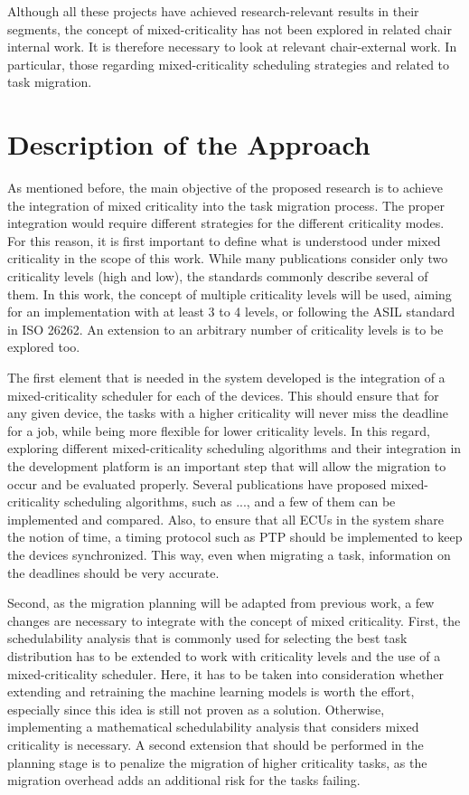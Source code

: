Although all these projects have achieved research-relevant results in their segments, the concept of mixed-criticality has not been explored in related chair internal work. It is therefore necessary to look at relevant chair-external work. In particular, those regarding mixed-criticality scheduling strategies and related to task migration.



\section*{Description of the Approach}\label{section:descriptionapproach}

As mentioned before, the main objective of the proposed research is to achieve the integration of mixed criticality into the task migration process. The proper integration would require different strategies for the different criticality modes. For this reason, it is first important to define what is understood under mixed criticality in the scope of this work. While many publications consider only two criticality levels (high and low), the standards commonly describe several of them. In this work, the concept of multiple criticality levels will be used, aiming for an implementation with at least 3 to 4 levels, or following the ASIL standard in ISO 26262. An extension to an arbitrary number of criticality levels is to be explored too.

The first element that is needed in the system developed is the integration of a mixed-criticality scheduler for each of the devices. This should ensure that for any given device, the tasks with a higher criticality will never miss the deadline for a job, while being more flexible for lower criticality levels. In this regard, exploring different mixed-criticality scheduling algorithms and their integration in the development platform is an important step that will allow the migration to occur and be evaluated properly. Several publications have proposed mixed-criticality scheduling algorithms, such as ..., and a few of them can be implemented and compared. Also, to ensure that all ECUs in the system share the notion of time, a timing protocol such as PTP should be implemented to keep the devices synchronized. This way, even when migrating a task, information on the deadlines should be very accurate.

Second, as the migration planning will be adapted from previous work, a few changes are necessary to integrate with the concept of mixed criticality. First, the schedulability analysis that is commonly used for selecting the best task distribution has to be extended to work with criticality levels and the use of a mixed-criticality scheduler. Here, it has to be taken into consideration whether extending and retraining the machine learning models is worth the effort, especially since this idea is still not proven as a solution. Otherwise, implementing a mathematical schedulability analysis that considers mixed criticality is necessary. A second extension that should be performed in the planning stage is to penalize the migration of higher criticality tasks, as the migration overhead adds an additional risk for the tasks failing. 

